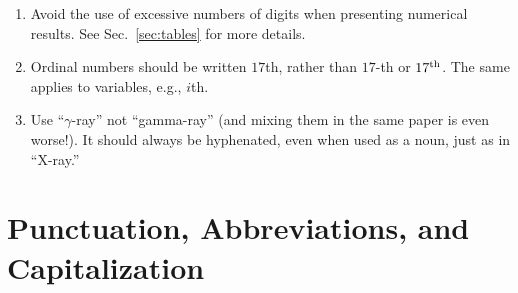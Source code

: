 \documentclass[letterpaper,11pt]{article}
\begin{document}
\begin{enumerate}


\item
Avoid the use of excessive numbers of digits when presenting numerical results.
See Sec.~\ref{sec:tables} for more details.

\item
Ordinal numbers should be written $17$th, rather than $17$-th or $17^{\rm th}$.
The same applies to variables, e.g., $i$th.

\item
Use ``$\gamma$-ray'' not ``gamma-ray'' (and mixing them in the same paper is
even worse!).  It should always be hyphenated, even when used as a noun,
just as in ``X-ray.''


\end{enumerate}


\section{Punctuation, Abbreviations, and Capitalization}
\end{document}
